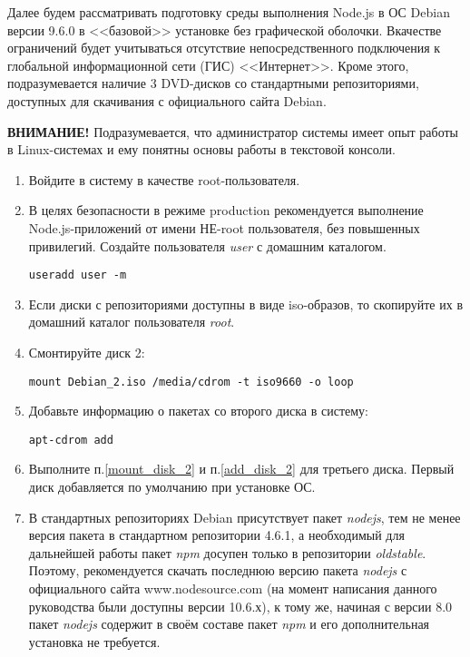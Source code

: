 Далее будем рассматривать подготовку среды выполнения Node.js в ОС Debian версии 9.6.0 в <<базовой>> установке без графической оболочки. Вкачестве ограничений будет учитываться отсутствие непосредственного подключения к глобальной информационной сети (ГИС) <<Интернет>>. Кроме этого, подразумевается наличие 3 DVD-дисков со стандартными репозиториями, доступных для скачивания с официального сайта Debian.


\textbf{ВНИМАНИЕ!} Подразумевается, что администратор системы имеет опыт работы в Linux-системах и ему понятны основы работы в текстовой консоли.

\begin{enumerate}

\item Войдите в систему в качестве root-пользователя.

\item В целях безопасности в режиме production рекомендуется выполнение Node.js-приложений от имени НЕ-root пользователя, без повышенных привилегий. Создайте пользователя \textit{user} с домашним каталогом.
	
	\verb|useradd user -m|

\item Если диски с репозиториями доступны в виде iso-образов, то скопируйте их в домашний каталог пользователя \textit{root}.

\item\label{mount_disk_2} Смонтируйте диск 2:

	\verb|mount Debian_2.iso /media/cdrom -t iso9660 -o loop|

\item\label{add_disk_2} Добавьте информацию о пакетах со второго диска в систему:
	
	\verb|apt-cdrom add|
	
\item Выполните п.\ref{mount_disk_2} и п.\ref{add_disk_2} для третьего диска. Первый диск добавляется по умолчанию при установке ОС.

\item В стандартных репозиториях Debian присутствует пакет \textit{nodejs}, тем не менее версия пакета в стандартном репозитории 4.6.1, а необходимый для  дальнейшей работы пакет \textit{npm} досупен только в репозитории \textit{oldstable}. Поэтому, рекомендуется скачать последнюю версию пакета \textit{nodejs} с официального сайта www.nodesource.com (на момент написания данного руководства были доступны версии 10.6.х), к тому же, начиная с версии 8.0 пакет \textit{nodejs} содержит в своём составе пакет \textit{npm} и его дополнительная установка не требуется.


\end{enumerate}
